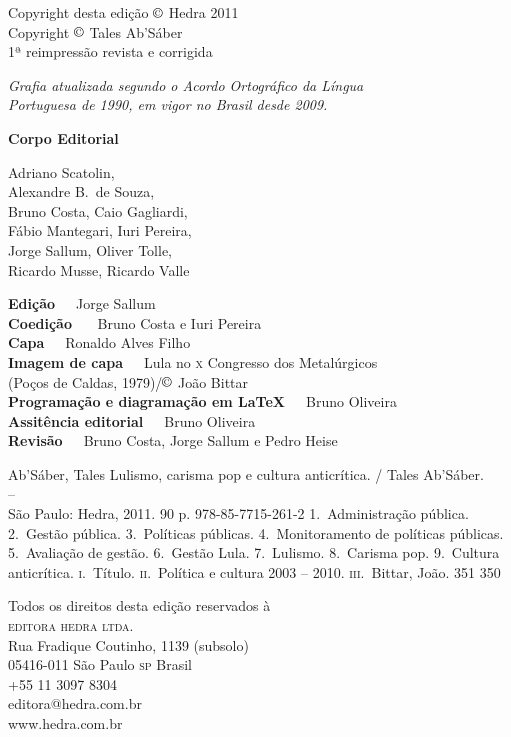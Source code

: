
\begingroup
\parindent0mm\parskip0mm
\footnotesize
\thispagestyle{empty}

Copyright desta edição $\copyright$ Hedra 2011\\
Copyright $\copyright$ Tales Ab'Sáber\\
1ª reimpressão revista e corrigida \medskip

{\itshape
Grafia atualizada segundo o Acordo Ortográfico da Língua\\
Portuguesa de 1990, em vigor no Brasil desde 2009. 
}\medskip

\textbf{Corpo Editorial}

Adriano Scatolin,\\
Alexandre B.~de Souza,\\
Bruno Costa,
Caio Gagliardi,\\
Fábio Mantegari,
Iuri Pereira,\\
Jorge Sallum,
Oliver Tolle,\\
Ricardo Musse,
Ricardo Valle\smallskip

\textbf{Edição}\ \ \  Jorge Sallum\\
\textbf{Coedição} \ \ \ Bruno Costa e Iuri Pereira\\
\textbf{Capa}\ \ \ Ronaldo Alves Filho\\
\textbf{Imagem de capa}\ \ \ Lula no \textsc{x} Congresso dos Metalúrgicos\\ (Poços de Caldas, 1979)/$\copyright$ João Bittar\\
\textbf{Programação e diagramação em \LaTeX}\ \ \  Bruno Oliveira\\
\textbf{Assitência editorial}\ \ \ Bruno Oliveira\\
\textbf{Revisão}\ \ \ Bruno Costa, Jorge Sallum e Pedro Heise\medskip

{Ab'Sáber, Tales}
{Lulismo, carisma pop e cultura anticrítica. / Tales Ab'Sáber.\\
--\\ São Paulo: Hedra, 2011. 90 p.}
{978-85-7715-261-2}
{1.~Administração pública.  2.~Gestão pública. 3.~Políticas públicas.
4.~Monitoramento de políticas públicas. 5.~Avaliação de gestão.  6.~Gestão Lula. 7.~Lulismo.
8.~Carisma pop. 9.~Cultura anticrítica.
\textsc{i}.~Título.  \textsc{ii}.~Política e cultura 2003 -- 2010. \textsc{iii}.~Bittar, João.}
{351}
{350}

Todos os direitos desta edição reservados à\\
\textsc{editora hedra ltda.}\\
Rua Fradique Coutinho, 1139 (subsolo)\\
05416-011 São Paulo \textsc{sp} Brasil\\
+55 11 3097 8304\\
editora@hedra.com.br\\
www.hedra.com.br

\pagebreak 

\endgroup
